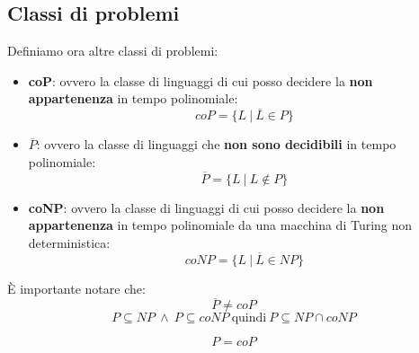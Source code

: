 \subsection{Classi di problemi}
Definiamo ora altre classi di problemi:
\begin{itemize}
    \item \textbf{coP}: ovvero la classe di linguaggi di cui posso decidere la
          \textbf{non appartenenza} in tempo polinomiale:
          \begin{equation}
              coP = \{L \ | \ \overline{L} \in P\}
          \end{equation}
    \item \textbf{$\overline{P}$}: ovvero la classe di linguaggi che \textbf{non
              sono decidibili} in tempo polinomiale:
          \begin{equation}
              \overline{P} = \{L \ | \ L \not\in P\}
          \end{equation}
    \item \textbf{coNP}: ovvero la classe di linguaggi di cui posso decidere la
          \textbf{non appartenenza} in tempo polinomiale da una macchina di
          Turing non deterministica:
          \begin{equation}
              coNP = \{L \ | \ \overline{L} \in NP\}
          \end{equation}
\end{itemize}
\begin{nota}
    È importante notare che:
    \begin{equation}
        \overline{P} \neq coP
    \end{equation}
    \begin{equation}
        P \subseteq NP \ \land \ P \subseteq coNP \ \text{quindi} \ P
        \subseteq NP \cap coNP
    \end{equation}
\end{nota}
\begin{teorema}
    \begin{equation}
        P = coP
    \end{equation}
\end{teorema}

